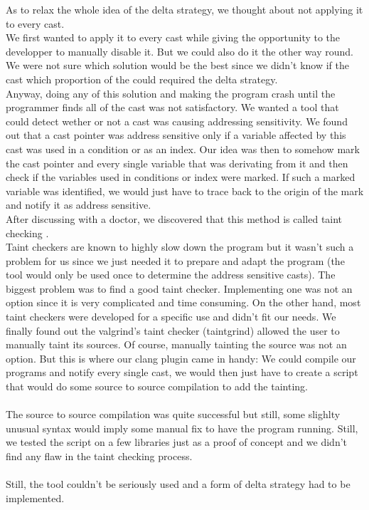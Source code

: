 \documentclass[english]{enstaPRE}
\begin{document}
As to relax the whole idea of the delta strategy, we thought about not applying it to every cast. \\
We first wanted to apply it to every cast while giving the opportunity to the developper to manually disable it. But we could also do
it the other way round. We were not sure which solution would be the best since we didn't know if the cast which proportion of the 
could required the delta strategy. \\ Anyway, doing any of this solution and making the program crash until the programmer finds all
of the cast was not satisfactory.
We wanted a tool that could detect wether or not a cast was causing addressing sensitivity. We found out that a cast pointer was
address sensitive only if a variable affected by this cast was used in a condition or as an index.
Our idea was then to somehow mark the cast pointer and every single variable that was derivating from it and then check if the variables
used in conditions or index were marked. If such a marked variable was identified, we would just have to trace back to the origin of
the mark and notify it as address sensitive. \\ 
After discussing with a doctor, we discovered that this method is called taint checking \cite{taint}. \\
Taint checkers are known to highly slow down the program but it wasn't such a problem for us since we just needed it to prepare and 
adapt the program (the tool would only be used once to determine the address sensitive casts). The biggest problem was to find a good 
taint checker. Implementing one was not an option since it is very complicated and time consuming. On the other hand, most taint 
checkers were developed for a specific use and didn't fit our needs. We finally found out the valgrind's taint checker (taintgrind)
allowed the user to manually taint its sources. Of course, manually tainting the source was not an option. But this is where our
clang plugin came in handy: We could compile our programs and notify every single cast, we would then just have to create a script 
that would do some source to source compilation to add the tainting.
\\ \\
The source to source compilation was quite successful but still, some slighlty unusual syntax would imply some manual fix to have the
program running. Still, we tested the script on a few libraries just as a proof of concept and we didn't find any flaw in the taint
checking process. \\ \\
Still, the tool couldn't be seriously used and a form of delta strategy had to be implemented. \\
\end{document}
